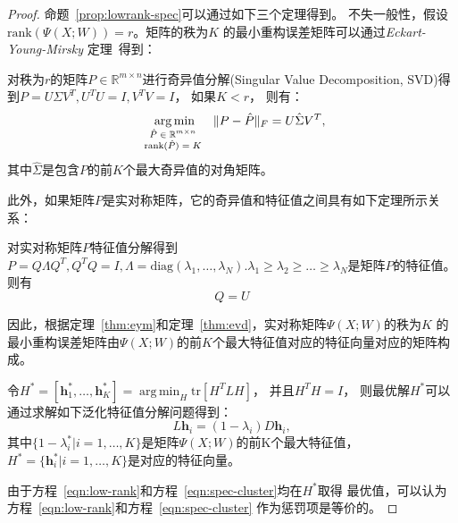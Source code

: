 \documentclass[doctor]{ustcthesis}
\def \h  {\mathbf{h}}
\DeclareMathOperator*{\argmin}{arg\,min}
\def \R {\mathbb{R}}
\begin{document}
\begin{proof}
    命题~\ref{prop:lowrank-spec}可以通过如下三个定理得到。
    不失一般性，假设$\text{rank}(\Psi(X;W)) = r$。矩阵的秩为$K$
    的最小重构误差矩阵可以通过\emph{Eckart-Young-Mirsky}
    定理~\cite{eckart1936approximation}得到：
    \begin{theorem}\label{thm:eym}
        对秩为$r$的矩阵$P\in \R^{m\times n}$进行奇异值分解(Singular Value
        Decomposition, SVD)得到$P=U\Sigma V^T, U^TU=I, V^TV=I$，
        如果$K < r$， 则有：
        $$%
        \argmin_{
            \mbox{\scriptsize
                $
                \begin{array}{c}
                    \hat{P} \in \R^{m\times n} \\
                    \text{rank}(\hat{P}) = K
                \end{array}
                $
            }
        } \|P - \hat{P}\|_F = U\hat{\Sigma}V^T,
        $$%
        其中$\hat{\Sigma}$是包含$P$的前$K$个最大奇异值的对角矩阵。
    \end{theorem}

    此外，如果矩阵$P$是实对称矩阵，它的奇异值和特征值之间具有如下定理所示关系：
    \begin{theorem}\label{thm:evd}
        对实对称矩阵$P$特征值分解得到$P=Q\Lambda Q^T, Q^TQ = I,
        \Lambda = \text{diag}(\lambda_1, \ldots, \lambda_N).
        \lambda_1 \geq \lambda_2 \geq \ldots \geq \lambda_N$是矩阵$P$的特征值。则有
        $$Q=U$$
    \end{theorem}
    因此，根据定理~\ref{thm:eym}和定理~\ref{thm:evd}，实对称矩阵$\Psi(X;W)$的秩为$K$
    的最小重构误差矩阵由$\Psi(X;W)$的前$K$个最大特征值对应的特征向量对应的矩阵构成。

    \begin{theorem}
        令$H^* = [\h_1^*, \ldots, \h_K^*] = \argmin_{H} \text{tr}[H^TLH]$，
        并且$H^TH = I$，
        则最优解$H^*$可以通过求解如下泛化特征值分解问题得到：
        $$
        L\h_i = (1-\lambda_i) D\h_i,
        $$
        其中$\{1-\lambda_i^* | i = 1,\ldots,
        K\}$是矩阵$\Psi(X;W)$的前K个最大特征值，
        $H^* = \{\h_i^* | i=1, \ldots, K\}$是对应的特征向量。
    \end{theorem}
    由于方程~\eqref{eqn:low-rank}和方程~\eqref{eqn:spec-cluster}均在$H^*$取得
    最优值，可以认为方程~\eqref{eqn:low-rank}和方程~\eqref{eqn:spec-cluster}
    作为惩罚项是等价的。
\end{proof}
\end{document}
